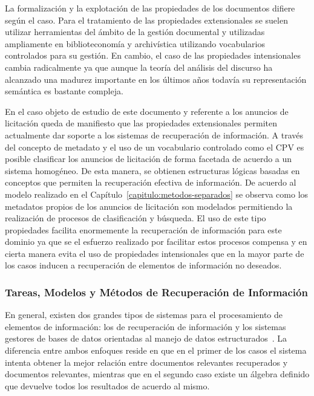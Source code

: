 La formalización y la explotación de las propiedades de los documentos 
difiere según el caso. Para el tratamiento de las propiedades extensionales 
se suelen utilizar herramientas del ámbito de la gestión documental y utilizadas 
ampliamente en biblioteconomía y archivística utilizando vocabularios 
controlados para su gestión. En cambio, el caso de las propiedades 
intensionales cambia radicalmente ya que aunque la teoría del análisis 
del discurso ha alcanzado una madurez importante en los últimos años 
todavía su representación semántica es bastante compleja.

En el caso objeto de estudio de este documento y referente a los anuncios 
de licitación queda de manifiesto que las propiedades extensionales permiten 
actualmente dar soporte a los sistemas de recuperación de información. A través 
del concepto de metadato y el uso de un vocabulario controlado como el \gls{CPV} 
es posible clasificar los anuncios de licitación de forma facetada 
de acuerdo a un sistema homogéneo. De esta manera, se obtienen estructuras 
lógicas basadas en conceptos que permiten la recuperación efectiva 
de información. De acuerdo al modelo realizado en el Capítulo~\ref{capitulo:metodos-separados} se observa 
como los metadatos propios de los anuncios de licitación son modelados permitiendo la realización de 
procesos de clasificación y búsqueda. El uso de este tipo propiedades facilita enormemente 
la recuperación de información para este dominio ya que se el esfuerzo realizado 
por facilitar estos procesos compensa y en cierta manera evita el uso de 
propiedades intensionales que en la mayor parte de los casos inducen 
a recuperación de elementos de información no deseados.

\subsubsection{Tareas, Modelos y Métodos de Recuperación de Información}
En general, existen dos grandes tipos de sistemas para el procesamiento 
de elementos de información: los de recuperación de información 
y los sistemas gestores de bases de datos orientadas al manejo 
de datos estructurados~\cite{Chen:1976:EMU:320434.320440}. La diferencia 
entre ambos enfoques reside en que en el primer de los casos el sistema 
intenta obtener la mejor relación entre documentos relevantes recuperados 
y documentos relevantes, mientras que en el segundo caso existe un álgebra 
definido que devuelve todos los resultados de acuerdo al mismo.

